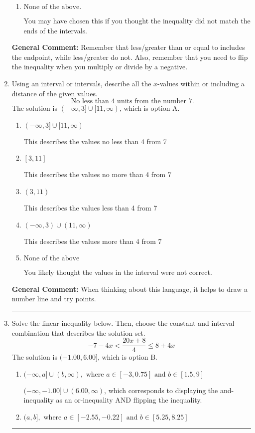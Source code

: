 \documentclass{extbook}[14pt]
\newcommand{\litem}[1]{\item #1

\rule{\textwidth}{0.4pt}}
\begin{document}
\begin{enumerate}
{\begin{enumerate}[label=\Alph*.]
 $[-2.25, \infty)$, which corresponds to switching the direction of the interval. You likely did this if you did not flip the inequality when dividing by a negative!
\item \( \text{None of the above}. \)

You may have chosen this if you thought the inequality did not match the ends of the intervals.
\end{enumerate}

\textbf{General Comment:} Remember that less/greater than or equal to includes the endpoint, while less/greater do not. Also, remember that you need to flip the inequality when you multiply or divide by a negative.
}
\litem{
Using an interval or intervals, describe all the $x$-values within or including a distance of the given values.
\[ \text{ No less than } 4 \text{ units from the number } 7. \]The solution is \( (-\infty, 3] \cup [11, \infty) \), which is option A.\begin{enumerate}[label=\Alph*.]
\item \( (-\infty, 3] \cup [11, \infty) \)

This describes the values no less than 4 from 7
\item \( [3, 11] \)

This describes the values no more than 4 from 7
\item \( (3, 11) \)

This describes the values less than 4 from 7
\item \( (-\infty, 3) \cup (11, \infty) \)

This describes the values more than 4 from 7
\item \( \text{None of the above} \)

You likely thought the values in the interval were not correct.
\end{enumerate}

\textbf{General Comment:} When thinking about this language, it helps to draw a number line and try points.
}
\litem{
Solve the linear inequality below. Then, choose the constant and interval combination that describes the solution set.
\[ -7 - 4 x < \frac{20 x + 8}{4} \leq 8 + 4 x \]The solution is \( (-1.00, 6.00] \), which is option B.\begin{enumerate}[label=\Alph*.]
\item \( (-\infty, a] \cup (b, \infty), \text{ where } a \in [-3, 0.75] \text{ and } b \in [1.5, 9] \)

$(-\infty, -1.00] \cup (6.00, \infty)$, which corresponds to displaying the and-inequality as an or-inequality AND flipping the inequality.
\item \( (a, b], \text{ where } a \in [-2.55, -0.22] \text{ and } b \in [5.25, 8.25] \)


\end{enumerate}}
\end{enumerate}
\end{document}
